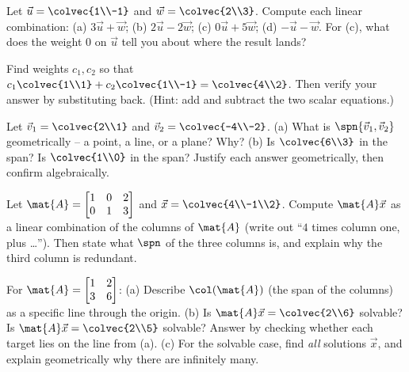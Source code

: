 \begin{exercise}\label{ch03:ex-warmup}
Let $\vec{u} = \colvec{1\\-1}$ and $\vec{w} = \colvec{2\\3}$. Compute each linear combination:
(a) $3\vec{u} + \vec{w}$;\;
(b) $2\vec{u} - 2\vec{w}$;\;
(c) $0\vec{u} + 5\vec{w}$;\;
(d) $-\vec{u} - \vec{w}$.
For (c), what does the weight $0$ on $\vec{u}$ tell you about where the result lands?
\end{exercise}

\begin{exercise}\label{ch03:ex-find-weights}
Find weights $c_1, c_2$ so that $c_1\colvec{1\\1} + c_2\colvec{1\\-1} = \colvec{4\\2}$. Then verify your answer by substituting back. (Hint: add and subtract the two scalar equations.)
\end{exercise}

\begin{exercise}\label{ch03:ex-membership}
Let $\vec{v}_1 = \colvec{2\\1}$ and $\vec{v}_2 = \colvec{-4\\-2}$.
(a) What is $\spn\{\vec{v}_1,\vec{v}_2\}$ geometrically -- a point, a line, or a plane? Why?
(b) Is $\colvec{6\\3}$ in the span? Is $\colvec{1\\0}$ in the span? Justify each answer geometrically, then confirm algebraically.
\end{exercise}

\begin{exercise}\label{ch03:ex-column}
Let $\mat{A} = \begin{bmatrix} 1 & 0 & 2 \\ 0 & 1 & 3 \end{bmatrix}$ and $\vec{x} = \colvec{4\\-1\\2}$. Compute $\mat{A}\vec{x}$ as a linear combination of the columns of $\mat{A}$ (write out ``$4$ times column one, plus \dots''). Then state what $\spn$ of the three columns is, and explain why the third column is redundant.
\end{exercise}

\begin{exercise}\label{ch03:ex-target}
For $\mat{A} = \begin{bmatrix} 1 & 2 \\ 3 & 6 \end{bmatrix}$:
(a) Describe $\col(\mat{A})$ (the span of the columns) as a specific line through the origin.
(b) Is $\mat{A}\vec{x} = \colvec{2\\6}$ solvable? Is $\mat{A}\vec{x} = \colvec{2\\5}$ solvable? Answer by checking whether each target lies on the line from (a).
(c) For the solvable case, find \emph{all} solutions $\vec{x}$, and explain geometrically why there are infinitely many.
\end{exercise}

